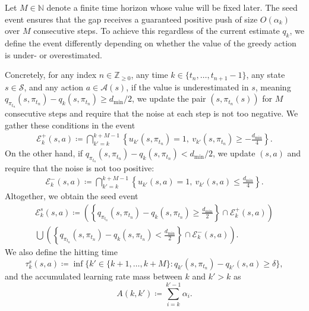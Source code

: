 Let $M \in \mathbb N$ denote a finite time horizon whose value will be fixed later.
The seed event ensures that the gap receives a guaranteed positive push of size $O(\alpha_k)$ over $M$ consecutive steps. To achieve this regardless of the current estimate $q_k$, we define the event differently depending on whether the value of the greedy action is under- or overestimated.

Concretely,
for any index $n \in \mathbb Z_{\ge 0}$,
any time $k \in \{t_n, \dots, t_{n+1}-1\}$,
any state $s \in \mathcal S$,
and any action $a \in \mathcal A(s)$,
if the value is underestimated in $s$, meaning $q_{\pi_{t_n}}(s,\pi_{t_n}) - q_{k}(s,{\pi_{t_n}}) \ge d_{\min}/2$,
we update the pair $(s,{\pi_{t_n}}(s))$ for $M$ consecutive steps and require that the noise at each step is not too negative. We gather these conditions in the event
\begin{align*}
    \mathcal E^+_k(s,a)
    \coloneqq 
    \bigcap_{k'=k}^{k+M-1}
    \left\{
    u_{k'}(s,\pi_{t_n}) = 1, \
    v_{k'}(s,\pi_{t_n}) \ge -\frac{d_{\min}}{4}
    \right\} .
\end{align*}
On the other hand, if $q_{\pi_{t_n}}(s,\pi_{t_n}) - q_{k}(s,{\pi_{t_n}}) < d_{\min}/2$,
we update $(s,a)$ and require that the noise is not too positive:
\begin{align*}
    \mathcal E^-_k(s,a)
    \coloneqq 
    \bigcap_{k'=k}^{k+M-1}
    \left\{
    u_{k'}(s,a) = 1, \
    v_{k'}(s,a) \le \frac{d_{\min}}{4}
    \right\} .
\end{align*}
Altogether, we obtain the seed event
\begin{multline}
\label{eq: def good prefix}
    \mathcal E^s_k(s,a) \coloneqq 
    \left( \left\{ q_{\pi_{t_n}}(s,\pi_{t_n}) - q_{k}(s,{\pi_{t_n}}) \ge \frac{d_{\min}}{2} \right\} \cap \mathcal E^+_k(s,a) \right) 
    \\
    \bigcup 
    \left( \left\{ q_{\pi_{t_n}}(s,\pi_{t_n}) - q_{k}(s,\pi_{t_n}) < \frac{d_{\min}}{2} \right\} \cap \mathcal E^-_k(s,a) \right) .
\end{multline}
We also define the hitting time
\[
\tau^s_k(s,a) \coloneqq \inf \big\{ k' \in \{k+1, \dots, k+M \} : q_{k'}(s,\pi_{t_n})-q_{k'}(s,a) \ge \delta \} ,
\]
and the accumulated learning rate mass between $k$ and $k'>k$ as
\[
A(k,k') \coloneqq \sum_{i=k}^{k'-1} \alpha_{i} .
\]

